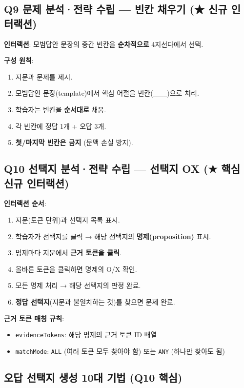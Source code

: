 \documentclass[11pt,a4paper]{article}
\begin{document}
\subsection{Q9 문제 분석·전략 수립 — 빈칸 채우기 (★ 신규 인터랙션)}

\textbf{인터랙션}: 모범답안 문장의 중간 빈칸을 \textbf{순차적으로} 4지선다에서 선택.

\textbf{구성 원칙}:
\begin{enumerate}
  \item 지문과 문제를 제시.
  \item 모범답안 문장(template)에서 핵심 어절을 빈칸(\texttt{\_\_\_\_})으로 처리.
  \item 학습자는 빈칸을 \textbf{순서대로} 채움.
  \item 각 빈칸에 정답 1개 + 오답 3개.
  \item \textbf{첫/마지막 빈칸은 금지} (문맥 손실 방지).
\end{enumerate}

\subsection{Q10 선택지 분석·전략 수립 — 선택지 OX (★ 핵심 신규 인터랙션)}

\textbf{인터랙션 순서}:
\begin{enumerate}
  \item 지문(토큰 단위)과 선택지 목록 표시.
  \item 학습자가 선택지를 클릭 → 해당 선택지의 \textbf{명제(proposition)} 표시.
  \item 명제마다 지문에서 \textbf{근거 토큰을 클릭}.
  \item 올바른 토큰을 클릭하면 명제의 O/X 확인.
  \item 모든 명제 처리 → 해당 선택지의 판정 완료.
  \item \textbf{정답 선택지}(지문과 불일치하는 것)를 찾으면 문제 완료.
\end{enumerate}

\textbf{근거 토큰 매칭 규칙}:
\begin{itemize}
  \item \texttt{evidenceTokens}: 해당 명제의 근거 토큰 ID 배열
  \item \texttt{matchMode}: \texttt{ALL} (여러 토큰 모두 찾아야 함) 또는 \texttt{ANY} (하나만 찾아도 됨)
\end{itemize}

\subsection{오답 선택지 생성 10대 기법 (Q10 핵심)}
\end{document}
